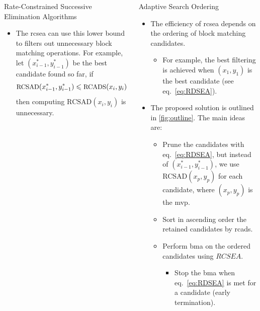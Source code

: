 \documentclass[10pt]{beamer}
\begin{document}
\begin{frame}[t]
\begin{columns}[t, onlytextwidth]
\begin{column}{0.32\textwidth}
\begin{block}{Rate-Constrained Successive Elimination Algorithms}
\begin{itemize}
            \item The \gls{rcsea} can use this lower bound to filters out unnecessary block matching operations. For example, let $(x^*_{i-1},y^*_{i-1})$ be the best candidate found so far,  if
            \begin{equation}\small
                \text{RCSAD}(x^*_{i-1},y^*_{i-1}) \leqslant \text{RCADS}(x_i,y_i)\:,
                \label{eq:RDSEA}
            \end{equation}
            then computing $\text{RCSAD}(x_i,y_i)$ is unnecessary.
            \end{itemize}
        \end{block}
    \end{column}
    
    \begin{column}{0.32\textwidth}
        \begin{block}{Adaptive Search Ordering}
           \begin{itemize}
           \item The efficiency of \gls{rcsea} depends on the ordering of block matching candidates. 
           \begin{itemize}
                \item For example, the best filtering is achieved when $(x_1,y_1)$ is the best candidate (see eq.~\ref{eq:RDSEA}).
           \end{itemize}
           
           \item The proposed solution is outlined in \cref{fig:outline}. The main ideas are:
                \begin{itemize}
                    \item Prune the candidates with eq.~\ref{eq:RDSEA}, but instead of $(x^*_{i-1},y^*_{i-1})$, we use RCSAD$(x_p,y_p)$ for each candidate, where $(x_p,y_p)$ is the \gls{mvp}.
                    \item Sort in ascending order the retained candidates by \gls{rcads}.
                    \item Perform \gls{bma} on the ordered candidates using $RCSEA$.
                    \begin{itemize}
                        \item Stop the \gls{bma} when eq.~\ref{eq:RDSEA} is met for a candidate (early termination).
                    \end{itemize}
                \end{itemize}
           \end{itemize}
            

\end{block}
\end{column}
\end{columns}
\end{frame}
\end{document}
